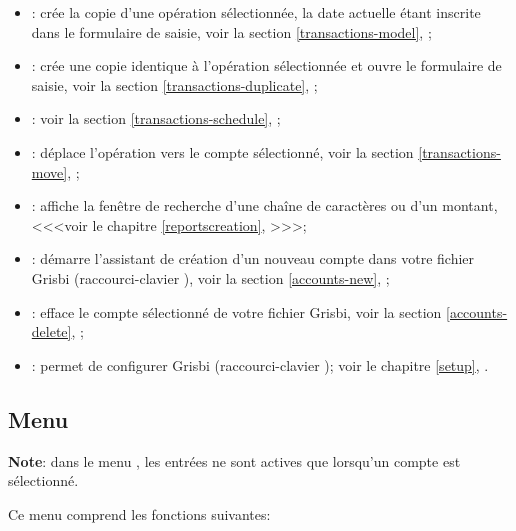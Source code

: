 \begin{itemize}	
\item {}: crée la copie d'une opération sélectionnée, la date actuelle étant inscrite dans le formulaire de saisie, voir la section \vref{transactions-model}, ;
\item {}: crée une copie identique à l'opération sélectionnée et ouvre le formulaire de saisie, voir la section \vref{transactions-duplicate}, ;
\item {}: voir la section \vref{transactions-schedule}, ;
\item {}: déplace l'opération vers le compte sélectionné, voir la section \vref{transactions-move}, ;
\item {}: affiche la fenêtre de	recherche d'une chaîne de caractères ou d'un montant, <<<voir le chapitre \vref{reportscreation}, >>>; %
\item {}: démarre l'assistant de création d'un nouveau compte dans votre fichier Grisbi (raccourci-clavier ), voir la section \vref{accounts-new}, ;
\item {}: efface le compte sélectionné de votre fichier Grisbi, voir la section \vref{accounts-delete}, ;
\item {}: permet de configurer Grisbi (raccourci-clavier ); voir le chapitre \vref{setup}, .
\end{itemize}


\subsection{Menu \label{home-menus-display}}
\textbf{Note}: dans le menu , les entrées ne sont actives que lorsqu'un compte est sélectionné.

Ce menu comprend les fonctions suivantes:

